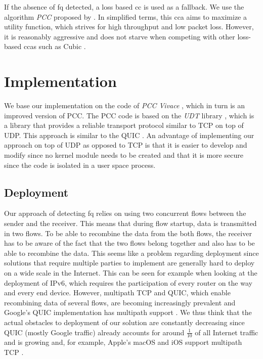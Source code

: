 \documentclass[runningheads]{llncs}
\begin{document}
If the absence of \gls{fq} detected, a loss based \gls{cc} is used as a fallback. We use the algorithm \textit{PCC} proposed by \cite{dong_pcc_2015}. In simplified terms, this \gls{cca} aims to maximize a utility function, which strives for high throughput and low packet loss. However, it is reasonably aggressive and does not starve when competing with other loss-based \glspl{cca} such as Cubic \cite{ha_cubic_2008}.

\section{Implementation}

We base our implementation on the code of \textit{PCC Vivace} \cite{dong_pcc_2018}, which in turn is an improved version of PCC. The PCC code is based on the \textit{UDT} library \cite{gu_udt_2007}, which is a library that provides a reliable transport protocol similar to TCP on top of UDP. This approach is similar to the QUIC \cite{iyengar_quic_2018}. An advantage of implementing our approach on top of UDP as opposed to TCP is that it is easier to develop and modify since no kernel module needs to be created and that it is more secure since the code is isolated in a user space process. 

\subsection{Deployment}

Our approach of detecting \gls{fq} relies on using two concurrent flows between the sender and the receiver. This means that during flow startup, data is transmitted in two flows. To be able to recombine the data from the both flows, the receiver has to be aware of the fact that the two flows belong together and also has to be able to recombine the data. This seems like a problem regarding deployment since solutions that require multiple parties to implement are generally hard to deploy on a wide scale in the Internet. This can be seen for example when looking at the deployment of IPv6, which requires the participation of every router on the way and every end device. However, multipath TCP \cite{handley_tcp_2012} and QUIC, which enable recombining data of several flows, are becoming increasingly prevalent and Google's QUIC implementation has multipath support \cite{google_quiche_2020}. We thus think that the actual obstacles to deployment of our solution are constantly decreasing since QUIC (mostly Google traffic) already accounts for around $\frac{1}{10}$ of all Internet traffic \cite{ruth_first_2018} and is growing and, for example, Apple's macOS and iOS support multipath TCP \cite{apple_about_2018}. 
\end{document}
